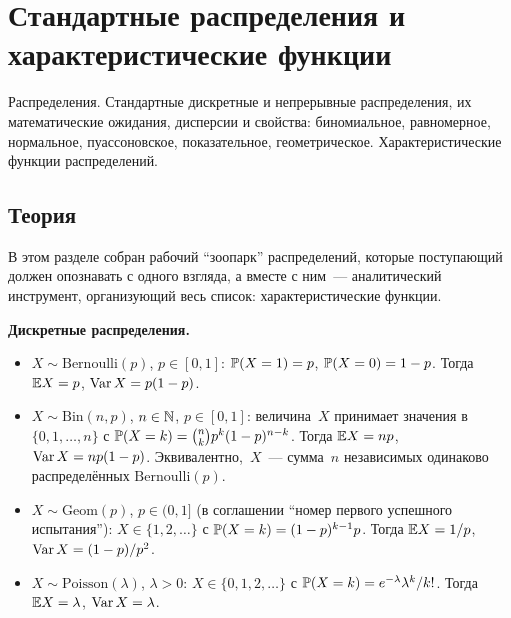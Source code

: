 
\section{Стандартные распределения и характеристические функции}
\label{sec:1.2.06-standard-distributions}

\begin{ticket}
Распределения. Стандартные дискретные и непрерывные распределения, их математические ожидания, дисперсии и свойства: биномиальное, равномерное, нормальное, пуассоновское, показательное, геометрическое. Характеристические функции распределений.
\end{ticket}

\subsection*{Теория}

В этом разделе собран рабочий ``зоопарк'' распределений, которые поступающий должен опознавать с одного взгляда, а вместе с ним~--- аналитический инструмент, организующий весь список: характеристические функции.

\medskip
\noindent\textbf{Дискретные распределения.}

\begin{definition}
\label{def:discrete-distributions}
\hphantom{x}
\begin{itemize}
  \item $X \sim \mathrm{Bernoulli}(p)$, $p \in [0,1]$: $\mathbb{P}(X = 1) = p$, $\mathbb{P}(X = 0) = 1 - p$. Тогда $\mathbb{E} X = p$, $\operatorname{Var} X = p(1 - p)$.
  \item $X \sim \mathrm{Bin}(n, p)$, $n \in \mathbb{N}$, $p \in [0, 1]$: величина~$X$ принимает значения в $\{0, 1, \dots, n\}$ с $\mathbb{P}(X = k) = \binom{n}{k} p^k (1 - p)^{n-k}$. Тогда $\mathbb{E} X = np$, $\operatorname{Var} X = np(1 - p)$. Эквивалентно,~$X$~--- сумма~$n$ независимых одинаково распределённых $\mathrm{Bernoulli}(p)$.
  \item $X \sim \mathrm{Geom}(p)$, $p \in (0, 1]$ (в соглашении ``номер первого успешного испытания''): $X \in \{1, 2, \dots\}$ с $\mathbb{P}(X = k) = (1 - p)^{k-1} p$. Тогда $\mathbb{E} X = 1/p$, $\operatorname{Var} X = (1 - p)/p^2$.
  \item $X \sim \mathrm{Poisson}(\lambda)$, $\lambda > 0$: $X \in \{0, 1, 2, \dots\}$ с $\mathbb{P}(X = k) = e^{-\lambda} \lambda^k / k!$. Тогда $\mathbb{E} X = \lambda$, $\operatorname{Var} X = \lambda$.
\end{itemize}
\end{definition}

